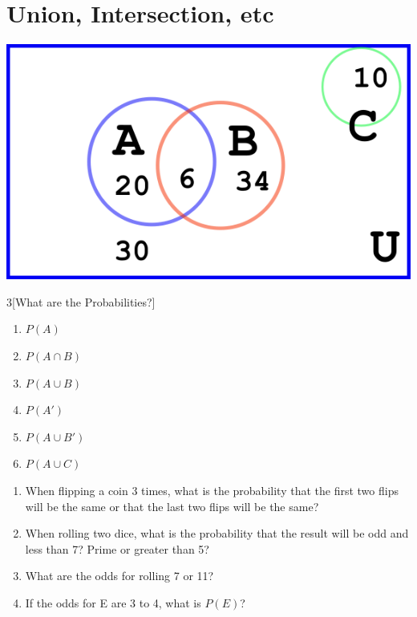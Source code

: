 \documentclass[14pt]{extarticle}
\begin{document}
\section{Union, Intersection, etc}
\includegraphics[width=0.5\linewidth]{venn-3}
\begin{multicols}{3}[What are the Probabilities?]
	\begin{enumerate}
		\item $P(A)$
		\vspace{0.5cm}
		\item $P(A\cap B)$
		\vspace{0.5cm}
		\item $P(A\cup B)$
		\vspace{0.5cm}
		\item $P(A')$
		\vspace{0.5cm}
		\item $P(A\cup B')$
		\vspace{0.5cm}
		\item $P(A\cup C)$
	\end{enumerate}
\end{multicols}
\vspace{0.5cm}
\begin{enumerate}\addtocounter{enumi}{6}
	\item When flipping a coin 3 times, what is the probability that the first two flips will be the same or that the last two flips will be the same?
	\vspace{2cm}
	\item When rolling two dice, what is the probability that the result will be odd and less than 7? Prime or greater than 5?
	\vspace{2cm}
	\item What are the odds for rolling 7 or 11?
	\vspace{2cm}
	\item If the odds for E are 3 to 4, what is $P(E)$?
\end{enumerate}
\end{document}
